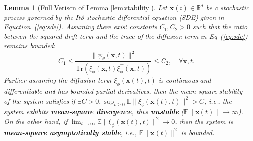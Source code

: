 \documentclass{article} %
\newtheorem{lem}{Lemma}
\begin{document}
\begin{lem}[Full Verison of Lemma \ref{lem:stability}]
    Let $\mathbf x(t) \in \mathbb R^d$ be a stochastic process governed by the Itô stochastic differential equation (SDE) given in Equation~(\ref{eq:sde}). 
    Assuming there exist constants \( C_1, C_2 > 0 \) such that the ratio between the squared drift term and the trace of the diffusion term in Eq~(\ref{eq:sde}) remains bounded:
\begin{equation}\label{eq:same_scale}
    C_1 \leq \frac{\|\psi_{\theta}(\mathbf{x}, t)\|^2}{\mathrm{Tr}(\xi_{\phi}(\mathbf{x}, t) \xi_{\phi}^\top(\mathbf{x}, t))} \leq C_2, \quad \forall \mathbf{x}, t.
\end{equation}
    Further assuming
    the diffusion term \( \xi_{\phi}(\mathbf{x}(t), t) \) is continuous and differentiable and has bounded partial derivatives, 
    then the mean-square stability of the system satisfies if $\exists C > 0, \sup_{t \geq 0} \mathbb{E} \|\xi_{\phi}(\mathbf{x}(t), t)\|^2 > C$, i.e., the system exhibits \textbf{mean-square divergence}, thus \textbf{unstable} ($\mathbb E \|\mathbf x(t)\| \rightarrow \infty$). On the other hand, if $\lim_{t \to \infty} \mathbb{E} \|\xi_{\phi}(\mathbf{x}(t), t)\|^2 \to 0$, then the system is \textbf{mean-square asymptotically stable}, i.e., $\mathbb E \|\mathbf x(t)\|^2$ is bounded. 
\end{lem}
\end{document}
